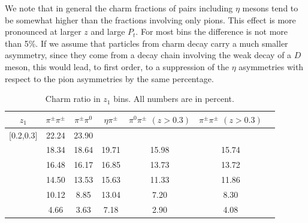 We note that in general the charm fractions of pairs including $\eta$ mesons tend to be somewhat higher than the fractions involving only pions. This effect is more pronounced at larger $z$ and large $P_t$. For most bins the difference is not more than 5\%. If we assume that particles from charm decay carry a much smaller asymmetry, since they come from a decay chain involving the weak decay of a $D$ meson, this would lead, to first order, to a suppression of the $\eta$ asymmetries with respect to the pion asymmetries by the same percentage.


\begin{table}[H]\footnotesize
\centering
\begin{tabular}{|c||c|c|c|c|c|c|}
\hline
$z_1$ & $\pi^{\pm}\pi^{\pm}$ & $\pi^{\pm}\pi^0$ & $\eta\pi^{\pm}$ & $\pi^0\pi^{\pm}$ $(z>0.3)$ & $\pi^{\pm}\pi^{\pm}$ $(z>0.3)$ \\ \hline\hline
[0.2,0.3]	&	22.24	&	23.90	&		&		&		\\ \hline
[0.3,0.4]	&	18.34	&	18.64	&	19.71	&	15.98	&	15.74	\\ \hline
[0.4,0.5]	&	16.48	&	16.17	&	16.85	&	13.73	&	13.72	\\ \hline
[0.5,0.6]	&	14.50	&	13.53	&	15.63	&	11.33	&	11.86	\\ \hline
[0.6,0.7]	&	10.12	&	8.85	&	13.04	&	7.20	&	8.30	\\ \hline
[0.7,1.0]	&	4.66	&	3.63	&	7.18	&	2.90	&	4.08	\\ \hline\end{tabular}
\caption[Charm ratio in $z_1$ bins]{Charm ratio in $z_1$ bins. All numbers are in percent.}
\label{tab:sinzcharmratio}
\end{table}

